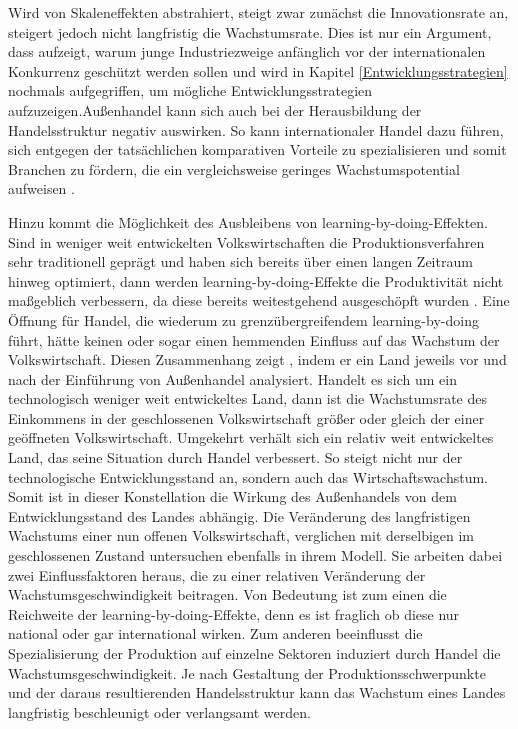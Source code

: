 Wird von Skaleneffekten abstrahiert, steigt zwar zun{\"a}chst die Innovationsrate an, steigert jedoch nicht langfristig die Wachstumsrate. Dies ist nur ein Argument, dass aufzeigt, warum junge Industriezweige anf{\"a}nglich vor der internationalen Konkurrenz gesch{\"u}tzt werden sollen und wird in Kapitel \ref{Entwicklungsstrategien} nochmals aufgegriffen, um mögliche Entwicklungsstrategien aufzuzeigen.\newline Au{\ss}enhandel kann sich auch bei der Herausbildung der Handelsstruktur negativ auswirken. So kann internationaler Handel dazu f{\"u}hren, sich entgegen der tats{\"a}chlichen komparativen Vorteile zu spezialisieren und somit Branchen zu f{\"o}rdern, die ein vergleichsweise geringes Wachstumspotential aufweisen \citep{Acemoglu.2009}.\newline 


Hinzu kommt die Möglichkeit des Ausbleibens von learning-by-doing-Effekten. Sind in weniger weit entwickelten Volkswirtschaften die Produktionsverfahren sehr traditionell gepr{\"a}gt und haben sich bereits {\"u}ber einen langen Zeitraum hinweg optimiert, dann werden learning-by-doing-Effekte die Produktivit{\"a}t nicht ma{\ss}geblich verbessern, da diese bereits weitestgehend ausgesch{\"o}pft wurden \citep{Young.1991}. Eine {\"O}ffnung f{\"u}r Handel, die wiederum zu grenz{\"u}bergreifendem learning-by-doing f{\"u}hrt, h{\"a}tte keinen oder sogar einen hemmenden Einfluss auf das Wachstum der Volkswirtschaft. \newline Diesen Zusammenhang zeigt \citet{Young.1991}, indem er ein Land jeweils vor und nach der Einf{\"u}hrung von Au{\ss}enhandel analysiert. Handelt es sich um ein technologisch weniger weit entwickeltes Land, dann ist die Wachstumsrate des Einkommens in der geschlossenen Volkswirtschaft gr{\"o}{\ss}er oder gleich der einer ge{\"o}ffneten Volkswirtschaft. Umgekehrt verh{\"a}lt sich ein relativ weit entwickeltes Land, das seine Situation durch Handel verbessert. So steigt nicht nur der technologische Entwicklungsstand an, sondern auch das Wirtschaftswachstum. Somit ist in dieser Konstellation die Wirkung des Au{\ss}enhandels von dem Entwicklungsstand des Landes abhängig.\newline
Die Ver{\"a}nderung des langfristigen Wachstums einer nun offenen Volkswirtschaft, verglichen mit derselbigen im geschlossenen Zustand untersuchen ebenfalls \citet{Grossman.1995} in ihrem Modell. Sie arbeiten dabei zwei Einflussfaktoren heraus, die zu einer relativen Ver{\"a}nderung der Wachstumsgeschwindigkeit beitragen. Von Bedeutung ist zum einen die Reichweite der learning-by-doing-Effekte, denn es ist fraglich ob diese nur national oder gar international wirken. Zum anderen beeinflusst die Spezialisierung der Produktion auf einzelne Sektoren induziert durch Handel die Wachstumsgeschwindigkeit. Je nach Gestaltung der Produktionsschwerpunkte und der daraus resultierenden Handelsstruktur kann das Wachstum eines Landes langfristig beschleunigt oder verlangsamt werden.\newline


